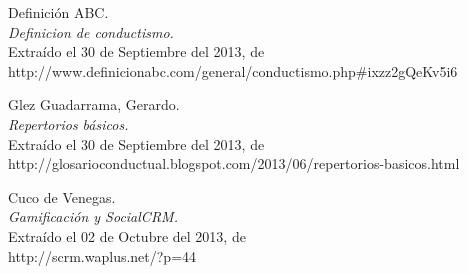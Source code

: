\begin{thebibliography}{99}
 Definición ABC.\\
\emph{Definicion de conductismo.}\\
Extraído el 30 de Septiembre del 2013, de\\
http://www.definicionabc.com/general/conductismo.php\#ixzz2gQeKv5i6

 Glez Guadarrama, Gerardo.\\
\emph{Repertorios básicos.}\\
Extraído el 30 de Septiembre del 2013, de\\
http://glosarioconductual.blogspot.com/2013/06/repertorios-basicos.html

 Cuco de Venegas.\\
\emph{Gamificación y SocialCRM.}\\
Extraído el 02 de Octubre del 2013, de\\
http://scrm.waplus.net/?p=44

\end{thebibliography}

